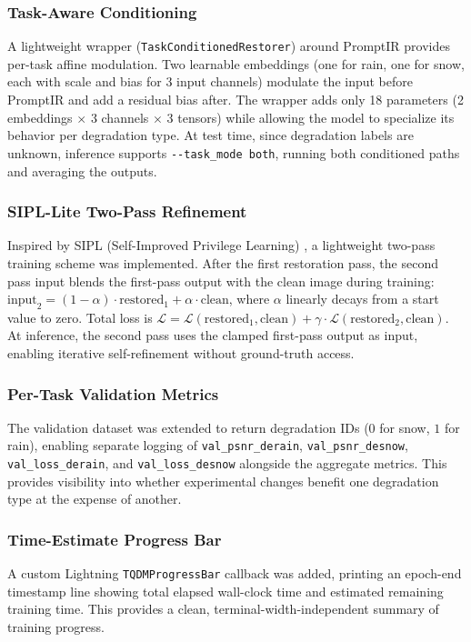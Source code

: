 \documentclass[12pt, a4paper]{article}
\begin{document}
\subsubsection{Task-Aware Conditioning}
A lightweight wrapper (\texttt{TaskConditionedRestorer}) around PromptIR provides per-task affine modulation. Two learnable embeddings (one for rain, one for snow, each with scale and bias for 3 input channels) modulate the input before PromptIR and add a residual bias after. The wrapper adds only 18 parameters (2 embeddings $\times$ 3 channels $\times$ 3 tensors) while allowing the model to specialize its behavior per degradation type. At test time, since degradation labels are unknown, inference supports \texttt{-{}-task\_mode both}, running both conditioned paths and averaging the outputs.

\subsubsection{SIPL-Lite Two-Pass Refinement}
Inspired by SIPL (Self-Improved Privilege Learning) \cite{wu2025}, a lightweight two-pass training scheme was implemented. After the first restoration pass, the second pass input blends the first-pass output with the clean image during training: $\text{input}_2 = (1-\alpha) \cdot \text{restored}_1 + \alpha \cdot \text{clean}$, where $\alpha$ linearly decays from a start value to zero. Total loss is $\mathcal{L} = \mathcal{L}(\text{restored}_1, \text{clean}) + \gamma \cdot \mathcal{L}(\text{restored}_2, \text{clean})$. At inference, the second pass uses the clamped first-pass output as input, enabling iterative self-refinement without ground-truth access.

\subsubsection{Per-Task Validation Metrics}
The validation dataset was extended to return degradation IDs ($0$ for snow, $1$ for rain), enabling separate logging of \texttt{val\_psnr\_derain}, \texttt{val\_psnr\_desnow}, \texttt{val\_loss\_derain}, and \texttt{val\_loss\_desnow} alongside the aggregate metrics. This provides visibility into whether experimental changes benefit one degradation type at the expense of another.

\subsubsection{Time-Estimate Progress Bar}
A custom Lightning \texttt{TQDMProgressBar} callback was added, printing an epoch-end timestamp line showing total elapsed wall-clock time and estimated remaining training time. This provides a clean, terminal-width-independent summary of training progress.
\end{document}
